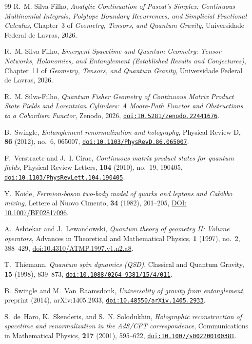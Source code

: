 \documentclass[11pt,a4paper,reqno]{amsart}
\theoremstyle{definition}
\numberwithin{equation}{section}
\providecommand{\doi}[1]{\href{https://doi.org/#1}{\nolinkurl{doi:#1}}}
\providecommand{\doi}[1]{\href{https://doi.org/#1}{\nolinkurl{doi:#1}}}
\begin{document}
\begin{thebibliography}{99}
 R.~M. Silva-Filho, \emph{Analytic Continuation of Pascal's Simplex: Continuous Multinomial Integrals, Polytope Boundary Recurrences, and Simplicial Fractional Calculus}, Chapter~3 of \emph{Geometry, Tensors, and Quantum Gravity}, Universidade Federal de Lavras, 2026.

 R.~M. Silva-Filho, \emph{Emergent Spacetime and Quantum Geometry: Tensor Networks, Holonomies, and Entanglement (Established Results and Conjectures)}, Chapter~11 of \emph{Geometry, Tensors, and Quantum Gravity}, Universidade Federal de Lavras, 2026.

 R.~M. Silva-Filho, \emph{Quantum Fisher Geometry of Continuous Matrix Product State Fields and Lorentzian Cylinders: A Moore-Path Functor and Obstructions to a Cobordism Functor}, Zenodo, 2026, \doi{10.5281/zenodo.22441676}.

B.~Swingle,
\emph{Entanglement renormalization and holography},
Physical Review D, \textbf{86} (2012), no.~6, 065007,
\doi{10.1103/PhysRevD.86.065007}.

F.~Verstraete and J.~I. Cirac,
\emph{Continuous matrix product states for quantum fields},
Physical Review Letters, \textbf{104} (2010), no.~19, 190405,
\doi{10.1103/PhysRevLett.104.190405}.

Y.~Koide,
\emph{Fermion-boson two-body model of quarks and leptons and Cabibbo mixing},
Lettere al Nuovo Cimento, \textbf{34} (1982), 201--205,
\href{https://doi.org/10.1007/BF02817096}{DOI: 10.1007/BF02817096}.

A.~Ashtekar and J.~Lewandowski,
\emph{Quantum theory of geometry II: Volume operators},
Advances in Theoretical and Mathematical Physics, \textbf{1} (1997), no.~2, 388--429,
\href{https://doi.org/10.4310/ATMP.1997.v1.n2.a8}{doi:10.4310/ATMP.1997.v1.n2.a8}.

T.~Thiemann,
\emph{Quantum spin dynamics (QSD)},
Classical and Quantum Gravity, \textbf{15} (1998), 839--873,
\doi{10.1088/0264-9381/15/4/011}.

B.~Swingle and M.~Van~Raamsdonk,
\emph{Universality of gravity from entanglement},
preprint (2014), arXiv:1405.2933,
\doi{10.48550/arXiv.1405.2933}.

S.~de~Haro, K.~Skenderis, and S.~N. Solodukhin,
\emph{Holographic reconstruction of spacetime and renormalization in the AdS/CFT correspondence},
Communications in Mathematical Physics, \textbf{217} (2001), 595--622,
\doi{10.1007/s002200100381}.


\end{thebibliography}
\end{document}
